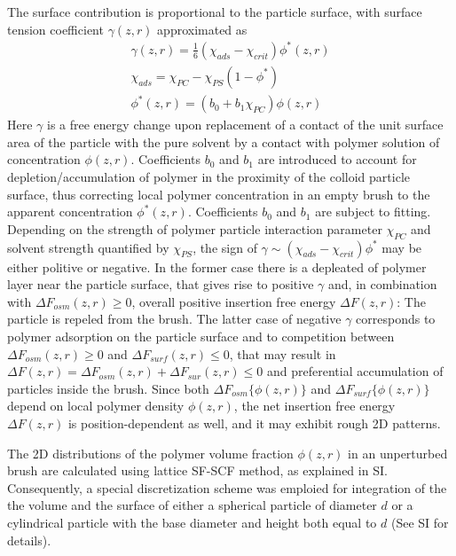 \documentclass[12pt, a4paper]{article}
\begin{document}
The surface contribution is proportional to the particle surface, with surface tension coefficient $\gamma (z,r)$ approximated as
\begin{eqnarray}
    \gamma (z,r)= \frac{1}{6}(\chi_{ads} - \chi_{crit})\phi^{\ast}(z,r)
    \\
    \chi_{ads} = \chi_{PC} - \chi_{PS}(1-\phi^{\ast})
    \\
    \phi^{\ast}(z,r)= (b_{0} + b_{1}\chi_{PC})\phi (z,r)
\end{eqnarray}
Here $\gamma$ is a free energy change upon replacement of a contact of the unit surface area of the particle with the pure solvent by a contact with polymer solution of concentration $\phi (z,r)$.
Coefficients $b_0$ and $b_1$ are introduced to account for  depletion/accumulation of polymer in the proximity of the colloid particle surface, thus correcting local polymer concentration in an empty brush 
to the apparent concentration $\phi^{\ast} (z,r)$. Coefficients $b_0$ and $b_1$ are subject to fitting.
Depending on the strength of polymer particle interaction parameter $\chi_{PC}$ and solvent strength quantified by  $\chi_{PS}$, the sign of $\gamma \sim (\chi_{ads} - \chi_{crit})\phi^{\ast}$ may be either politive or negative.
In the former case there is a depleated of polymer layer near the particle surface, that gives rise to positive $\gamma$ and, in combination with $\Delta F_{osm}(z,r)\geq 0$, overall positive insertion free energy $\Delta F(z,r)$: 
The particle is repeled from the brush. The latter case of negative $\gamma$ corresponds to polymer adsorption on the particle surface and to competition between $\Delta F_{osm}(z,r)\geq 0$ and $\Delta F_{surf}(z,r)\leq 0$, 
that may result in $\Delta F(z,r) = \Delta F_{osm} (z,r)+ \Delta F_{sur}(z,r)\leq 0$ and preferential accumulation of particles inside the brush. Since both $\Delta F_{osm}\{\phi(z,r)\}$ and $\Delta F_{surf}\{\phi(z,r)\}$ depend
on local polymer density $\phi(z,r)$, the net insertion free energy $\Delta F(z,r)$ is position-dependent as well, and it may exhibit rough 2D patterns.

The 2D distributions of the polymer volume fraction $\phi(z,r)$ in an unperturbed brush are calculated using lattice SF-SCF method, as explained in SI.
Consequently, a special discretization scheme was emploied for integration 
of the the volume and the surface of either a spherical particle of diameter $d$ or a cylindrical particle with the base diameter and height both equal to $d$ (See SI for details).
\end{document}
